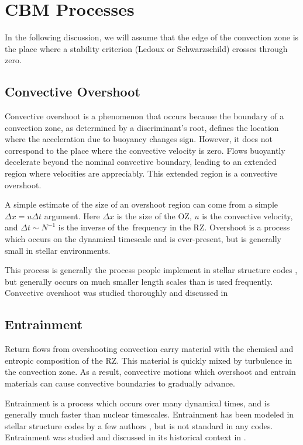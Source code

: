 \section{CBM Processes}
\label{sec:processes}

In the following discussion, we will assume that the edge of the convection zone is the place where a stability criterion (Ledoux or Schwarzschild) crosses through zero.

\subsection{Convective Overshoot}
Convective overshoot is a phenomenon that occurs because the boundary of a convection zone, as determined by a discriminant's root, defines the location where the acceleration due to buoyancy changes sign.
However, it does not correspond to the place where the convective velocity is zero.
Flows buoyantly decelerate beyond the nominal convective boundary, leading to an extended region where velocities are appreciably.
This extended region is a convective overshoot.

A simple estimate of the size of an overshoot region can come from a simple $\Delta x = u \Delta t$ argument.
Here $\Delta x$ is the size of the OZ, $u$ is the convective velocity, and $\Delta t \sim N^{-1}$ is the inverse of the \brunt$\,$frequency in the RZ.
Overshoot is a process which occurs on the dynamical timescale and is ever-present, but is generally small in stellar environments.

This process is generally the process people implement in stellar structure codes \citep[per e.g.,][]{herwig_2000}, but generally occurs on much smaller length scales than is used frequently.
Convective overshoot was studied thoroughly and discussed in \citet{korre_etal_2019}


\subsection{Entrainment}
Return flows from overshooting convection carry material with the chemical and entropic composition of the RZ.
This material is quickly mixed by turbulence in the convection zone.
As a result, convective motions which overshoot and entrain materials can cause convective boundaries to gradually advance.

Entrainment is a process which occurs over many dynamical times, and is generally much faster than nuclear timescales.
Entrainment has been modeled in stellar structure codes by a few authors \citep{staritsin_2013, scott_etal_2021}, but is not standard in any codes.
Entrainment was studied and discussed in its historical context in \citet{fuentes_cumming_2020}.


